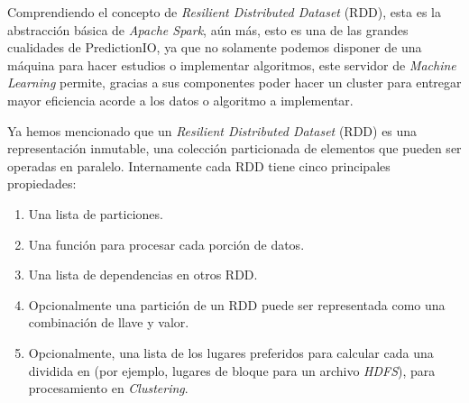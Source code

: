  Comprendiendo el concepto de \emph{Resilient Distributed Dataset} (RDD), esta es la abstracción básica de \emph{Apache Spark}, aún más, esto es una de las grandes cualidades de PredictionIO, ya que no solamente podemos disponer de una máquina para hacer estudios o implementar algoritmos, este servidor de \emph{Machine Learning} permite, gracias a sus componentes poder hacer un cluster para entregar mayor eficiencia acorde a los datos o algoritmo a implementar.

  Ya hemos mencionado que un \emph{Resilient Distributed Dataset} (RDD) es una representación inmutable, una colección particionada de elementos que pueden ser operadas en paralelo. Internamente cada RDD tiene cinco principales propiedades:


  \begin{enumerate}
    \item Una lista de particiones.
    \item Una función para procesar cada porción de datos.
    \item Una lista de dependencias en otros RDD. 
    \item Opcionalmente una partición de un RDD puede ser representada como una combinación de llave y valor. 
    \item Opcionalmente, una lista de los lugares preferidos para calcular cada una dividida en (por ejemplo, lugares de bloque para un archivo \emph{HDFS}), para procesamiento en \emph{Clustering}.

  \end{enumerate}




















